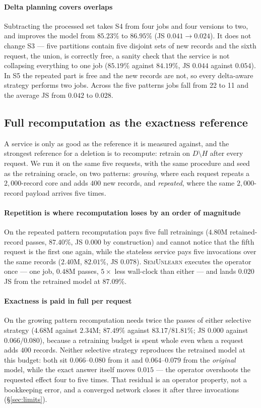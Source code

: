 \documentclass[conference]{IEEEtran}
\newcommand{\sys}{\textsc{SemUnlearn}}
\begin{document}
\paragraph{Delta planning covers overlaps}
Subtracting the processed set takes S4 from four jobs and four versions to two, and improves
the model from $85.23\%$ to $86.95\%$ (JS $0.041\to0.024$).  It does not change S3 --- five
partitions contain five disjoint sets of new records and the sixth request, the union, is
correctly free, a sanity check that the service is not collapsing everything to one job
($85.19\%$ against $84.19\%$, JS $0.044$ against $0.054$).  In S5 the repeated part is free
and the new records are not, so every delta-aware strategy performs two jobs.  Across the five
patterns jobs fall from 22 to 11 and the average JS from $0.042$ to $0.028$.

\subsection{Full recomputation as the exactness reference}
\label{sec:eval-recompute}
A service is only as good as the reference it is measured against, and the strongest
reference for a deletion is to recompute: retrain on $D\setminus H$ after every request.
We run it on the same five requests, with the same procedure and seed as the retraining
oracle, on two patterns: \emph{growing}, where each request repeats a $2{,}000$-record core
and adds $400$ new records, and \emph{repeated}, where the same $2{,}000$-record payload
arrives five times.

\paragraph{Repetition is where recomputation loses by an order of magnitude}
On the repeated pattern recomputation pays five full retrainings ($4.80$M retained-record
passes, $87.40\%$, JS $0.000$ by construction) and cannot notice that the fifth request is
the first one again, while the stateless service pays five invocations over the same records
($2.40$M, $82.01\%$, JS $0.078$).  \sys{} executes the operator once --- one job, $0.48$M
passes, $5\times$ less wall-clock than either --- and lands $0.020$ JS from the retrained
model at $87.09\%$.

\paragraph{Exactness is paid in full per request}
On the growing pattern recomputation needs twice the passes of either selective strategy
($4.68$M against $2.34$M; $87.49\%$ against $83.17/81.81\%$; JS $0.000$ against
$0.066/0.080$), because a retraining budget is spent whole even when a request adds $400$
records.  Neither selective strategy reproduces the retrained model at this budget: both sit
$0.066$--$0.080$ from it and $0.064$--$0.079$ from the \emph{original}
model, while the exact answer itself moves $0.015$ --- the operator overshoots the
requested effect four to five times.  That residual is an operator property, not a
bookkeeping error, and a converged network closes it after three invocations
(\S\ref{sec:limits}).
\end{document}
